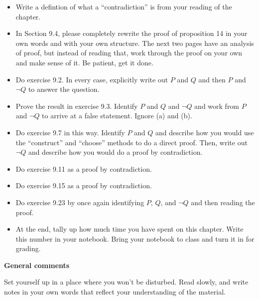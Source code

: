 \begin{itemize}
\item Write a defintion of what a ``contradiction'' is from your reading of the chapter.

\item In Section 9.4, please completely rewrite the proof of proposition 14 in your own words and with your own structure.
The next two pages have an analysis of proof, but instead of reading that, work through the proof on your own and make sense of it.  Be patient, get it done.

\item Do exercise 9.2.  In every case, explicitly write out $P$ and $Q$ and then $P$ and $\lnot Q$ to answer the question.

\item Prove the result in exercise 9.3.  Identify $P$ and $Q$ and $\lnot Q$ and work from $P$ and $\lnot Q$ to arrive at a false statement.  Ignore (a) and (b).

\item Do exercise 9.7 in this way.
Identify $P$ and $Q$ and describe how you would use the ``construct'' and ``choose'' methods to do a direct proof.
Then, write out $\lnot Q$ and describe how you would do a proof by contradiction.

\item Do exercise 9.11 as a proof by contradiction.

\item Do exercise 9.15 as a proof by contradiction.

\item Do exercise 9.23 by once again identifying $P$, $Q$, and $\lnot Q$ and then reading the proof.

\item At the end, tally up how much time you have spent on this chapter.
Write this number in your notebook.
Bring your notebook to class and turn it in for grading.
\end{itemize}

\noindent
{\bf General comments}

Set yourself up in a place where you won't be disturbed.
Read slowly, and write notes in your own words that reflect your understanding of the material.
